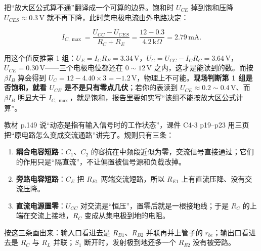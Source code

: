 \documentclass[11pt]{ctexart}
\let\orighdr\hdr
\renewcommand{\hdr}[2]{\needspace{12\baselineskip}\orighdr{#1}{#2}}
\let\origsubhdr\subhdr
\renewcommand{\subhdr}[1]{\needspace{3\baselineskip}\origsubhdr{#1}}
\begin{document}

把“放大区公式算不通”翻译成一个可算的边界。饱和时 $U_{CE}$ 掉到饱和压降 $U_{CES}\approx0.3\,\mathrm{V}$ 就不再下降，此时集电极电流由外电路决定：

\[
I_{C,\max}=\frac{U_{CC}-U_{CES}}{R_C+R_E}
=\frac{12-0.3}{4.2\,\mathrm{k}\Omega}=2.79\,\mathrm{mA}.
\]

用这个值反推第 1 组：$U_E=I_C R_E=3.34\,\mathrm{V}$，$U_C=U_{CC}-I_CR_C=3.64\,\mathrm{V}$，$U_{CE}=0.30\,\mathrm{V}$——三个电极电位都还在 $0\sim12\,\mathrm{V}$ 之内，这才是能读到的数。而按 $\beta I_B$ 算会得到 $U_C=12-4.40\times3=-1.2\,\mathrm{V}$，物理上不可能。\textbf{现场判断第 1 组是否饱和，就看 $U_{CE}$ 是不是只有零点几伏}；若你的表读到 $U_{CE}\approx0.2\sim0.4\,\mathrm{V}$、而 $\beta I_B$ 明显大于 $I_{C,\max}$，就是饱和，报告里要如实写“该组不能按放大区公式计算”。




教材 p.149 说“动态是指有输入信号时的工作状态”，课件 C4-3 p19--p23 用三页把“原电路怎么变成交流通路”讲完了。规则只有三条：

\begin{enumerate}
\item \textbf{耦合电容短路}：$C_1$、$C_2$ 的容抗在中频段近似为零，交流信号直接通过；它们的作用只是“隔直流”，不让偏置被信号源和负载改掉。
\item \textbf{旁路电容短路}：$C_E$ 把 $R_{E1}$ 两端交流短路，所以 $R_{E1}$ 上有直流压降、没有交流压降。
\item \textbf{直流电源置零}：$U_{CC}$ 对交流是“恒压”，置零后就是一根接地线；于是 $R_C$ 的上端在交流上接地，$R_C$ 变成从集电极到地的电阻。
\end{enumerate}

按这三条画出来：输入口看进去是 $R_{B1}$、$R_{B2}$ 并联再并上管子的 $r_{be}$；输出口看进去是 $R_C$ 与 $R_L$ 并联；$S_1$ 断开时，发射极到地还多一个 $R_{E2}$ 没有被旁路。

\end{document}

